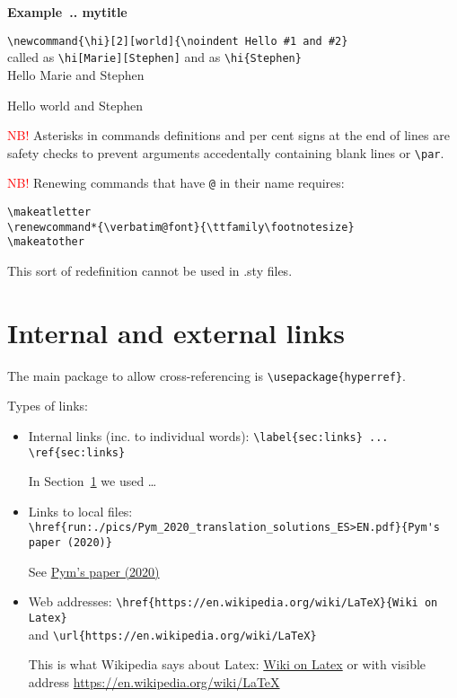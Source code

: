 \documentclass[a4paper,11pt]{article}
\newcommand{\hi}[2][world]{\noindent Hello #1 and #2}
\newcounter{example}
\newenvironment{examples}[1][mytitle]{\refstepcounter{example}\par\medskip
	\noindent \textbf{Example~\thesection.\theexample. #1}\par \rmfamily}{\medskip}
\begin{document}
\begin{examples}
	\verb|\newcommand{\hi}[2][world]{\noindent Hello #1 and #2}| \\
	called as 	\verb|\hi[Marie][Stephen]| and as \verb|\hi{Stephen}|\\
	
	\hi[Marie]{Stephen}
	
	\hi{Stephen}
\end{examples}

\textcolor{red}{NB!} Asterisks in commands definitions and per cent signs at the end of lines are safety checks to prevent arguments accedentally containing blank lines or \verb|\par|.

\bigskip
\textcolor{red}{NB!} Renewing commands that have \verb|@| in their name requires:
\begin{lstlisting}
\makeatletter
\renewcommand*{\verbatim@font}{\ttfamily\footnotesize}
\makeatother
\end{lstlisting}
This sort of redefinition cannot be used in .sty files.

\clearpage

\section{Internal and external links}\label{sec:links}

The main package to allow cross-referencing is \verb|\usepackage{hyperref}|.

Types of links:

\begin{itemize}
	\item Internal links (inc. to individual words): \verb|\label{sec:links} ... \ref{sec:links}|
	
	In Section~\ref{sec:links} we used \ldots
	
	\item Links to local files: \\ \verb|\href{run:./pics/Pym_2020_translation_solutions_ES>EN.pdf}{Pym's paper (2020)}| 
	
	See \href{run:./pics/Pym_2020_translation_solutions_ES>EN.pdf}{Pym's paper (2020)}
	
	
	\item Web addresses: \verb|\href{https://en.wikipedia.org/wiki/LaTeX}{Wiki on Latex}| \\
and \verb|\url{https://en.wikipedia.org/wiki/LaTeX}| 

	This is what Wikipedia says about Latex: \href{https://en.wikipedia.org/wiki/LaTeX}{Wiki on Latex} or with visible address \url{https://en.wikipedia.org/wiki/LaTeX}

\end{itemize}
\end{document}

